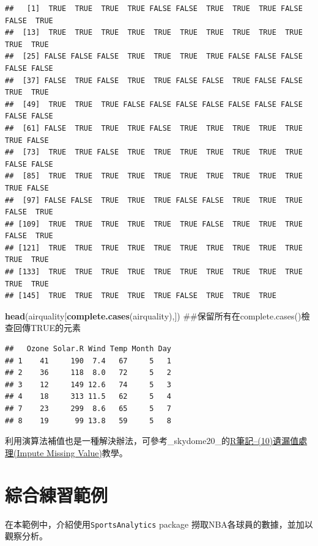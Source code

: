 \documentclass[]{book}
\newenvironment{Shaded}{\begin{snugshade}}{\end{snugshade}}
\newcommand{\KeywordTok}[1]{\textcolor[rgb]{0.13,0.29,0.53}{\textbf{{#1}}}}
\newcommand{\NormalTok}[1]{{#1}}
\theoremstyle{definition}
\theoremstyle{definition}
\theoremstyle{remark}
\begin{document}
\begin{verbatim}
##   [1]  TRUE  TRUE  TRUE  TRUE FALSE FALSE  TRUE  TRUE  TRUE FALSE FALSE  TRUE
##  [13]  TRUE  TRUE  TRUE  TRUE  TRUE  TRUE  TRUE  TRUE  TRUE  TRUE  TRUE  TRUE
##  [25] FALSE FALSE FALSE  TRUE  TRUE  TRUE  TRUE FALSE FALSE FALSE FALSE FALSE
##  [37] FALSE  TRUE FALSE  TRUE  TRUE FALSE FALSE  TRUE FALSE FALSE  TRUE  TRUE
##  [49]  TRUE  TRUE  TRUE FALSE FALSE FALSE FALSE FALSE FALSE FALSE FALSE FALSE
##  [61] FALSE  TRUE  TRUE  TRUE FALSE  TRUE  TRUE  TRUE  TRUE  TRUE  TRUE FALSE
##  [73]  TRUE  TRUE FALSE  TRUE  TRUE  TRUE  TRUE  TRUE  TRUE  TRUE FALSE FALSE
##  [85]  TRUE  TRUE  TRUE  TRUE  TRUE  TRUE  TRUE  TRUE  TRUE  TRUE  TRUE FALSE
##  [97] FALSE FALSE  TRUE  TRUE  TRUE FALSE FALSE  TRUE  TRUE  TRUE FALSE  TRUE
## [109]  TRUE  TRUE  TRUE  TRUE  TRUE  TRUE FALSE  TRUE  TRUE  TRUE FALSE  TRUE
## [121]  TRUE  TRUE  TRUE  TRUE  TRUE  TRUE  TRUE  TRUE  TRUE  TRUE  TRUE  TRUE
## [133]  TRUE  TRUE  TRUE  TRUE  TRUE  TRUE  TRUE  TRUE  TRUE  TRUE  TRUE  TRUE
## [145]  TRUE  TRUE  TRUE  TRUE  TRUE FALSE  TRUE  TRUE  TRUE
\end{verbatim}

\begin{Shaded}
\begin{Highlighting}[]
\KeywordTok{head}\NormalTok{(airquality[}\KeywordTok{complete.cases}\NormalTok{(airquality),]) ##保留所有在complete.cases()檢查回傳TRUE的元素}
\end{Highlighting}
\end{Shaded}

\begin{verbatim}
##   Ozone Solar.R Wind Temp Month Day
## 1    41     190  7.4   67     5   1
## 2    36     118  8.0   72     5   2
## 3    12     149 12.6   74     5   3
## 4    18     313 11.5   62     5   4
## 7    23     299  8.6   65     5   7
## 8    19      99 13.8   59     5   8
\end{verbatim}

利用演算法補值也是一種解決辦法，可參考\_skydome20\_的\href{http://www.rpubs.com/skydome20/R-Note10-Missing_Value}{R筆記--(10)遺漏值處理(Impute
Missing Value)}教學。

\section{綜合練習範例}

在本範例中，介紹使用\texttt{SportsAnalytics} \citep{R-SportsAnalytics}
package 撈取NBA各球員的數據，並加以觀察分析。
\end{document}

